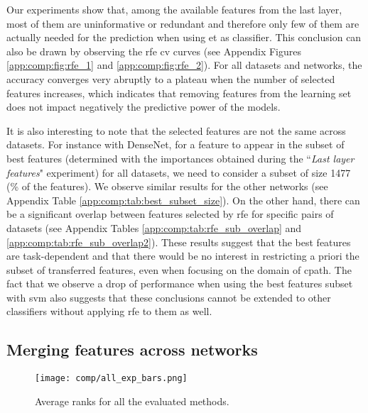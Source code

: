 Our experiments show that, among the available features from the last layer, most of them are uninformative or redundant and therefore only few of them are actually needed for the prediction when using \acrshort{et} as classifier. This conclusion can also be drawn by observing the \acrlong{rfe} \acrlong{cv} curves (see Appendix Figures \ref{app:comp:fig:rfe_1} and 
\ref{app:comp:fig:rfe_2}). For all datasets and networks, the accuracy converges very abruptly to a plateau when the number of selected features increases, which indicates that removing features from the learning set does not impact negatively the predictive power of the models.  

It is also interesting to note that the selected features are not the same across datasets. For instance with DenseNet, for a feature to appear in the subset of best features (determined with the importances obtained during the ``\textit{Last layer features}" experiment) for all datasets, we need to consider a subset of size 1477 (\% of the features). We observe similar results for the other networks (see Appendix Table \ref{app:comp:tab:best_subset_size}). On the other hand, there can be a significant overlap between features selected by \acrshort{rfe} for specific pairs of datasets (see Appendix Tables \ref{app:comp:tab:rfe_sub_overlap} and \ref{app:comp:tab:rfe_sub_overlap2}). These results suggest that the best features are task-dependent and that there would be no interest in restricting a priori the subset of transferred features, even when focusing on the domain of \acrlong{cpath}. The fact that we observe a drop of performance when using the best features subset with \acrshort{svm} also suggests that these conclusions cannot be extended to other classifiers without applying \acrshort{rfe} to them as well.
 
\subsection{Merging features across networks}
\label{ssec:comp:exp_merge_net}

\begin{figure}
    \centering 
    \texttt{[image: comp/all\_exp\_bars.png]}
    \caption{Average ranks for all the evaluated methods.}
    \label{fig:comp:res_avg_ranks_all_methods}
\end{figure}

